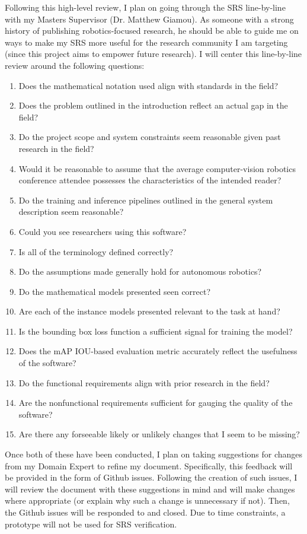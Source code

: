 \documentclass[12pt, titlepage]{article}
\begin{document}
Following this high-level review, I plan on going through the SRS line-by-line with my Masters Supervisor 
(Dr. Matthew Giamou). As someone with a strong history of publishing robotics-focused research, he should be 
able to guide me on ways to make my SRS more useful for the research community I am targeting (since this project 
aims to empower future research). I will center this line-by-line review around the following questions:
\begin{enumerate}
  \item Does the mathematical notation used align with standards in the field?
  \item Does the problem outlined in the introduction reflect an actual gap in the field?
  \item Do the project scope and system constraints seem reasonable given past research in the field?
  \item Would it be reasonable to assume that the average computer-vision robotics conference attendee possesses the characteristics of the intended reader?
  \item Do the training and inference pipelines outlined in the general system description seem reasonable?
  \item Could you see researchers using this software?
  \item Is all of the terminology defined correctly?
  \item Do the assumptions made generally hold for autonomous robotics?
  \item Do the mathematical models presented seen correct?
  \item Are each of the instance models presented relevant to the task at hand?
  \item Is the bounding box loss function a sufficient signal for training the model?
  \item Does the mAP IOU-based evaluation metric accurately reflect the usefulness of the software?
  \item Do the functional requirements align with prior research in the field?
  \item Are the nonfunctional requirements sufficient for gauging the quality of the software?
  \item Are there any forseeable likely or unlikely changes that I seem to be missing?
\end{enumerate}


Once both of these have been conducted, I plan on taking suggestions for changes from my Domain Expert 
to refine my document. Specifically, this feedback will be provided in the form of Github issues. Following 
the creation of such issues, I will review the document with these suggestions in mind and will make changes 
where appropriate (or explain why such a change is unnecessary if not). Then, the Github issues will be responded to and closed. 
Due to time constraints, a prototype will not be used for SRS verification. 
\end{document}
